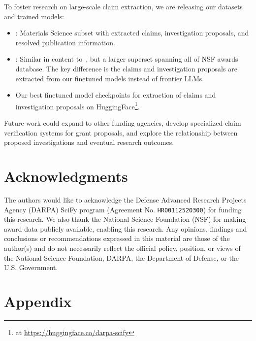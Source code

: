 \documentclass[11pt]{article}
\begin{document}
To foster research on large-scale claim extraction, we are releasing our datasets and trained models:
\begin{itemize}[noitemsep,topsep=0pt]
\item \DatasetNameMatSci: Materials Science subset with extracted claims, investigation proposals, and resolved publication information.
\item \DatasetName: Similar in content to~\DatasetNameMatSci, but a larger superset spanning all of NSF awards database. The key difference is the claims and investigation proposals are extracted from our finetuned models instead of frontier LLMs.
\item Our best finetuned model checkpoints for extraction of claims and investigation proposals on HuggingFace\footnote{at \url{https://huggingface.co/darpa-scify}}.
\end{itemize}

Future work could expand to other funding agencies, develop specialized claim verification systems for grant proposals, and explore the relationship between proposed investigations and eventual research outcomes.

\section*{Acknowledgments}
The authors would like to acknowledge the Defense Advanced Research Projects Agency (DARPA) SciFy program (Agreement No. \texttt{HR00112520300}) for funding this research. We also thank the National Science Foundation (NSF) for making award data publicly available, enabling this research. Any opinions, findings and conclusions or recommendations expressed in this material are those of the author(s) and do not necessarily reflect the official policy, position, or views of the National Science Foundation, DARPA, the Department of Defense, or the U.S. Government.

%


\clearpage

\section*{Appendix}

\appendix
\end{document}
